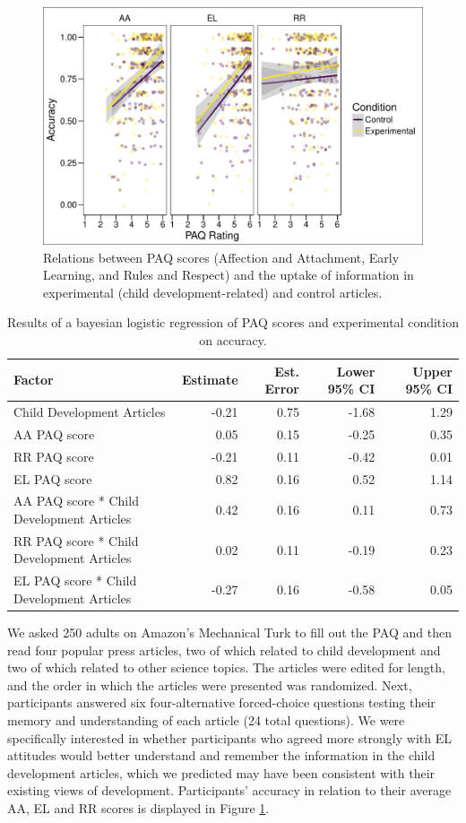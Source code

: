 \documentclass[man]{apa6}
\theoremstyle{definition}
\theoremstyle{definition}
\theoremstyle{definition}
\theoremstyle{remark}
\begin{document}
\begin{figure}
\centering
\includegraphics{PAQ_paper_files/figure-latex/uptake-1.pdf}
\caption{\label{fig:uptake}Relations between PAQ scores (Affection and
Attachment, Early Learning, and Rules and Respect) and the uptake of
information in experimental (child development-related) and control
articles.}
\end{figure}

\begin{table}[h]
\centering
\caption{Results of a bayesian logistic regression of PAQ scores and experimental condition on accuracy.} 
\label{tab:uptake}
\begin{tabular}{lrrrr}
  \hline
Factor & Estimate & Est. Error & Lower 95\% CI & Upper 95\% CI \\ 
  \hline
Child Development Articles & -0.21 & 0.75 & -1.68 & 1.29 \\ 
  AA PAQ score & 0.05 & 0.15 & -0.25 & 0.35 \\ 
  RR PAQ score & -0.21 & 0.11 & -0.42 & 0.01 \\ 
  EL PAQ score & 0.82 & 0.16 & 0.52 & 1.14 \\ 
  AA PAQ score * Child Development Articles & 0.42 & 0.16 & 0.11 & 0.73 \\ 
  RR PAQ score * Child Development Articles & 0.02 & 0.11 & -0.19 & 0.23 \\ 
  EL PAQ score * Child Development Articles & -0.27 & 0.16 & -0.58 & 0.05 \\ 
   \hline
\end{tabular}
\end{table}

We asked 250 adults on Amazon's Mechanical Turk to fill out the PAQ and
then read four popular press articles, two of which related to child
development and two of which related to other science topics. The
articles were edited for length, and the order in which the articles
were presented was randomized. Next, participants answered six
four-alternative forced-choice questions testing their memory and
understanding of each article (24 total questions). We were specifically
interested in whether participants who agreed more strongly with EL
attitudes would better understand and remember the information in the
child development articles, which we predicted may have been consistent
with their existing views of development. Participants' accuracy in
relation to their average AA, EL and RR scores is displayed in Figure
\ref{fig:uptake}.
\end{document}
